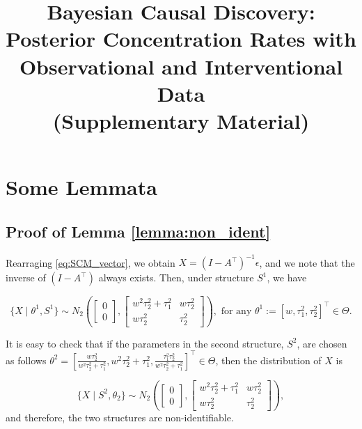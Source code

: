 \documentclass[accepted]{uai2026} %
\def\transpose{\intercal}
\theoremstyle{boldremark}
\begin{document}



\newpage

\onecolumn

\title{Bayesian Causal Discovery: Posterior Concentration Rates with Observational and Interventional Data\\(Supplementary Material)}
\maketitle
\appendix
\section{Some Lemmata}
\subsection{Proof of Lemma \ref{lemma:non_ident}}
\label{appendix:lemma_non_ident}
Rearraging \eqref{eq:SCM_vector}, we obtain $X = (I-A^\transpose)^{-1}\epsilon$, and we note that the inverse of $(I-A^\transpose)$ always exists. Then, under structure $S^1$, we have

    $$\{X\mid \theta^1, S^1\}  \sim N_2\left( \begin{bmatrix}
        0\\ 0
    \end{bmatrix}, \begin{bmatrix}
        w^2\tau_2^2+\tau_1^2 &w\tau_2^2\\
        w\tau_2^2 & \tau_2^2
    \end{bmatrix} \right), \text{ for any } \theta^1 := [w, \tau_1^2, \tau_2^2]^\transpose \in \Theta.$$

    It is easy to check that if the parameters in the second structure, $S^2$, are chosen as follows $\theta^2 = \left[\frac{w\tau_2^2}{w^2\tau_2^2+\tau_1^2},w^2\tau_2^2+\tau_1^2, \frac{\tau_1^2\tau_2^2}{w^2\tau_2^2+\tau_1^2}\right]^\transpose \in \Theta$, then the distribution of $X$ is 

    $$\{X\mid S^2, \theta_2\} \sim N_2\left( \begin{bmatrix}
        0\\ 0
    \end{bmatrix}, \begin{bmatrix}
        w^2\tau_2^2+\tau_1^2 &w\tau_2^2\\
        w\tau_2^2 & \tau_2^2
    \end{bmatrix} \right),$$
    and therefore, the two structures are non-identifiable. 
\end{document}
